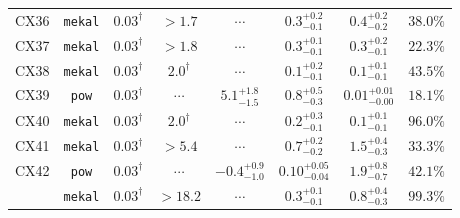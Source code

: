 \documentclass[fleqn,usenatbib]{mnras}
\newcommand\nodata{ ~$\cdots$~ }%
\newcommand{\nd}{\nodata}
\begin{document}
\begin{table*}
\begin{tabular}{lccccccc}
      CX36   & {\tt mekal} & $0.03^\dag$ & $>1.7$ & \nd & $0.3^{+0.2}_{-0.1}$ & $0.4^{+0.2}_{-0.2}$ & $38.0\%$ \\
      CX37   & {\tt mekal} & $0.03^\dag$ & $>1.8$ & \nd & $0.3^{+0.1}_{-0.1}$ & $0.3^{+0.2}_{-0.1}$ & $22.3\%$ \\
      CX38   & {\tt mekal}   & $0.03^\dag$ & $2.0^\dag$ & \nd & $0.1^{+0.2}_{-0.1}$ & $0.1^{+0.1}_{-0.1}$ & $43.5\%$ \\
      CX39   & {\tt pow}   & $0.03^\dag$ & \nd & $5.1^{+1.8}_{-1.5}$ & $0.8^{+0.5}_{-0.3}$ & $0.01^{+0.01}_{-0.00}$ & $18.1\%$ \\
      CX40   & {\tt mekal}   & $0.03^\dag$ & $2.0^\dag$ & \nd & $0.2^{+0.3}_{-0.1}$ & $0.1^{+0.1}_{-0.1}$ & $96.0\%$ \\
      CX41   & {\tt mekal} & $0.03^\dag$ & $>5.4$ & \nd & $0.7^{+0.2}_{-0.2}$ & $1.5^{+0.4}_{-0.3}$ & $33.3\%$ \\
      \hline
      \multirow{2}{*}{CX42} & {\tt pow}   & $0.03^\dag$ & \nd & $-0.4^{+0.9}_{-1.0}$ & $0.10^{+0.05}_{-0.04}$ & $1.9^{+0.8}_{-0.7}$ & $42.1\%$ \\
                          & {\tt mekal} & $0.03^\dag$ & $>18.2$ & \nd & $0.3^{+0.1}_{-0.1}$ & $0.8^{+0.4}_{-0.3}$ & $99.3\%$ \\
      \hline
    \end{tabular}%
\end{table*}
\end{document}
